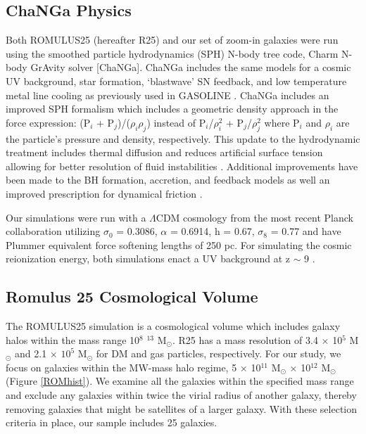 \documentclass[]{emulateapj}
\begin{document}

\subsection{ChaNGa Physics} 
Both ROMULUS25 (hereafter R25) and our set of zoom-in galaxies were run using the smoothed particle hydrodynamics (SPH) N-body tree code, Charm N-body GrAvity solver [ChaNGa]\citep{Menon2015}. ChaNGa includes the same models for a cosmic UV background, star formation, `blastwave' SN feedback, and low temperature metal line cooling as previously used in GASOLINE \citep{Wadsley2004,Wadsley2008,Stinson2006,Shen2010}. ChaNGa includes an improved SPH formalism which includes a geometric density approach in the force expression: (P$_i$ + P$_j$)/($\rho_i \rho_j$) instead of P$_i$/$\rho_{i}^2$ + P$_j$/$\rho_{j}^2$ where P$_i$ and $\rho_i$ are the particle's pressure and density, respectively. This update to the hydrodynamic treatment includes thermal diffusion \citep{Shen2010} and reduces artificial surface tension allowing for better resolution of fluid instabilities \citep{Ritchie2001,Menon2015,Governato2015}. Additional improvements have been made to the BH formation, accretion, and feedback models as well an improved prescription for dynamical friction \citep{Tremmel2015,Tremmel2017}. 

Our simulations were run with a $\Lambda$CDM cosmology from the most recent Planck collaboration utilizing $\sigma_0$ = 0.3086, $\alpha$ = 0.6914, h = 0.67, $\sigma_8$ = 0.77 and have Plummer equivalent force softening lengths of 250 pc. For simulating the cosmic reionization energy, both simulations enact a UV background at z $\sim$ 9 \citep{Haardt2012}.

\subsection{Romulus 25 Cosmological Volume}
The ROMULUS25 \citep{Tremmel2017} simulation is a cosmological volume which includes galaxy halos within the mass range 10$^{8}$ $^{13}$ M$_{\odot}$. R25 has a mass resolution of 3.4 $\times$ 10$^5$ M$_{\odot}$ and 2.1 $\times$ $10^5$ M$_{\odot}$ for DM and gas particles, respectively. For our study, we focus on galaxies within the MW-mass halo regime, 5 $\times$ 10$^{11}$ M$_{\odot}$  $\times$ 10$^{12}$ M$_{\odot}$ (Figure \ref{ROMhist}). We examine all the galaxies within the specified mass range and exclude any galaxies within twice the virial radius of another galaxy, thereby removing galaxies that might be satellites of a larger galaxy. With these selection criteria in place, our sample includes 25 galaxies.
\end{document}
